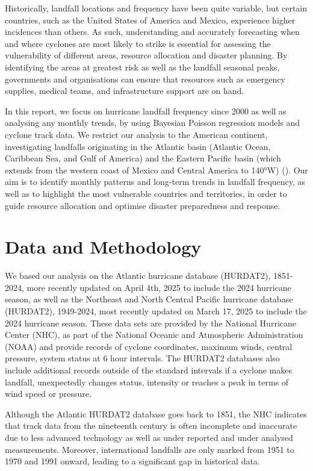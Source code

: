 \documentclass[
]{article}
\begin{document}
Historically, landfall locations and frequency have been quite variable, but certain countries, such as the United States of America and Mexico, experience higher incidences than others. As such, understanding and accurately forecasting when and where cyclones are most likely to strike is essential for assessing the vulnerability of different areas, resource allocation and disaster planning. By identifying the areas at greatest risk as well as the landfall seasonal peaks, governments and organisations can ensure that resources such as emergency supplies, medical teams, and infrastructure support are on hand.

In this report, we focus on hurricane landfall frequency since 2000 as well as analysing any monthly trends, by using Bayesian Poisson regression models and cyclone track data. We restrict our analysis to the American continent, investigating landfalls originating in the Atlantic basin (Atlantic Ocean, Caribbean Sea, and Gulf of America) and the Eastern Pacific basin (which extends from the western coast of Mexico and Central America to 140°W) (). Our aim is to identify monthly patterns and long-term trends in landfall frequency, as well as to highlight the most vulnerable countries and territories, in order to guide resource allocation and optimise disaster preparedness and response.

\section{Data and Methodology}\label{data-and-methodology}

We based our analysis on the Atlantic hurricane database (HURDAT2), 1851-2024, more recently updated on April 4th, 2025 to include the 2024 hurricane season, as well as the Northeast and North Central Pacific hurricane database (HURDAT2), 1949-2024, most recently updated on March 17, 2025 to include the 2024 hurricane season. These data sets are provided by the National Hurricane Center (NHC), as part of the National Oceanic and Atmospheric Administration (NOAA) and provide records of cyclone coordinates, maximum winds, central pressure, system status at 6 hour intervals. The HURDAT2 databases also include additional records outside of the standard intervals if a cyclone makes landfall, unexpectedly changes status, intensity or reaches a peak in terms of wind speed or pressure.

Although the Atlantic HURDAT2 database goes back to 1851, the NHC indicates that track data from the nineteenth century is often incomplete and inaccurate due to less advanced technology as well as under reported and under analysed measurements. Moreover, international landfalls are only marked from 1951 to 1970 and 1991 onward, leading to a significant gap in historical data.
\end{document}
